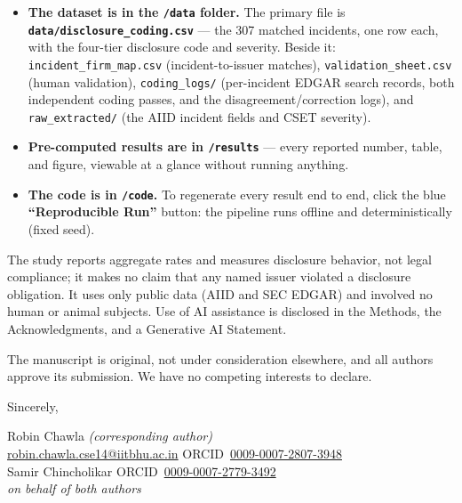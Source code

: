 \documentclass[11pt]{article}
\begin{document}
\begin{itemize}\setlength{\itemsep}{1pt}\setlength{\parskip}{0pt}\setlength{\topsep}{2pt}
\item \textbf{The dataset is in the \texttt{/data} folder.} The primary file is \textbf{\texttt{data/disclosure\_coding.csv}} --- the 307 matched incidents, one row each, with the four-tier disclosure code and severity. Beside it: \texttt{incident\_firm\_map.csv} (incident-to-issuer matches), \texttt{validation\_sheet.csv} (human validation), \texttt{coding\_logs/} (per-incident EDGAR search records, both independent coding passes, and the disagreement/correction logs), and \texttt{raw\_extracted/} (the AIID incident fields and CSET severity).
\item \textbf{Pre-computed results are in \texttt{/results}} --- every reported number, table, and figure, viewable at a glance without running anything.
\item \textbf{The code is in \texttt{/code}.} To regenerate every result end to end, click the blue \textbf{``Reproducible Run''} button: the pipeline runs offline and deterministically (fixed seed).
\end{itemize}

The study reports aggregate rates and measures disclosure behavior, not legal compliance; it makes no claim that any named issuer violated a disclosure obligation. It uses only public data (AIID and SEC EDGAR) and involved no human or animal subjects. Use of AI assistance is disclosed in the Methods, the Acknowledgments, and a Generative AI Statement.

The manuscript is original, not under consideration elsewhere, and all authors approve its submission. We have no competing interests to declare.

\vspace{6pt}
Sincerely,

\begingroup\raggedright
Robin Chawla \emph{(corresponding author)}\\
\href{mailto:robin.chawla.cse14@iitbhu.ac.in}{robin.chawla.cse14@iitbhu.ac.in} \quad ORCID~\mbox{\href{https://orcid.org/0009-0007-2807-3948}{0009-0007-2807-3948}}\\[3pt]
Samir Chincholikar \quad ORCID~\mbox{\href{https://orcid.org/0009-0007-2779-3492}{0009-0007-2779-3492}}\\[3pt]
\emph{on behalf of both authors}
\par\endgroup
\end{document}
